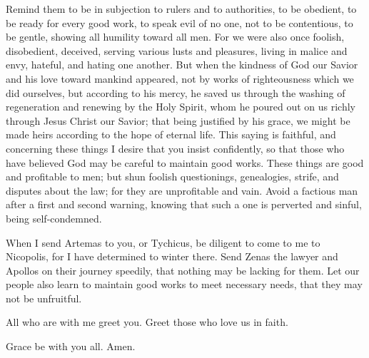  Remind them to be in subjection to rulers and to
authorities, to be obedient, to be ready for every good work,
 to speak evil of no one, not to be contentious, to be
gentle, showing all humility toward all men.  For we were
also once foolish, disobedient, deceived, serving various lusts and
pleasures, living in malice and envy, hateful, and hating one another.
 But when the kindness of God our Savior and his love
toward mankind appeared,  not by works of righteousness
which we did ourselves, but according to his mercy, he saved us through
the washing of regeneration and renewing by the Holy Spirit,
 whom he poured out on us richly through Jesus Christ our
Savior;  that being justified by his grace, we might be
made heirs according to the hope of eternal life.  This
saying is faithful, and concerning these things I desire that you insist
confidently, so that those who have believed God may be careful to
maintain good works. These things are good and profitable to men;
 but shun foolish questionings, genealogies, strife, and
disputes about the law; for they are unprofitable and vain.
 Avoid a factious man after a first and second warning,
 knowing that such a one is perverted and sinful, being
self-condemned.

 When I send Artemas to you, or Tychicus, be diligent to
come to me to Nicopolis, for I have determined to winter there.
 Send Zenas the lawyer and Apollos on their journey
speedily, that nothing may be lacking for them.  Let our
people also learn to maintain good works to meet necessary needs, that
they may not be unfruitful.

 All who are with me greet you. Greet those who love us
in faith.

Grace be with you all. Amen.
